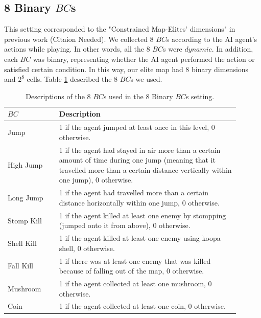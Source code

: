 \documentclass[conference]{IEEEtran}
\begin{document}
\subsection{8 Binary $BC$s}
This setting corresponded to the "Constrained Map-Elites’ dimensions" in previous work (Citaion Needed). We collected 8 
$BC$s according to the AI agent's actions while playing. In other words, all the 8 $BC$s were $dynamic$. In addition, each $BC$ was binary, representing whether the AI agent performed
the action or satisfied certain condition. In this way, our elite map had 8 binary dimensions and $2^8$ cells. Table 
\ref{tab:8BCs} described the 8 $BC$s we used. \\
\begin{table}[h!]
    \centering
    \begin{tabular} {|p{0.20\linewidth}|p{0.70\linewidth}|}
        \hline
        $BC$ & Description \\
        \hline \hline
        Jump & 1 if the agent jumped at least once in this level, 0 otherwise.\\
        \hline
        High Jump & 1 if the agent had stayed in air more than a certain amount of time during one jump (meaning that it travelled more than a certain distance vertically within one jump), 0 otherwise.\\
        \hline 
        Long Jump & 1 if the agent had travelled more than a certain distance horizontally within one jump, 0 otherwise.\\
        \hline
        Stomp Kill & 1 if the agent killed at least one enemy by stompping (jumped onto it from above), 0 otherwise.\\
        \hline
        Shell Kill & 1 if the agent killed at least one enemy using koopa shell, 0 otherwise.\\
        \hline
        Fall Kill & 1 if there was at least one enemy that was killed because of falling out of the map, 0 otherwise.\\
        \hline
        Mushroom & 1 if the agent collected at least one mushroom, 0 otherwise.\\
        \hline
        Coin & 1 if the agent collected at least one coin, 0 otherwise.\\
        \hline
    \end{tabular}
\caption{Descriptions of the 8 $BC$s used in the 8 Binary $BC$s setting.}
\label{tab:8BCs}
\end{table}
\end{document}
